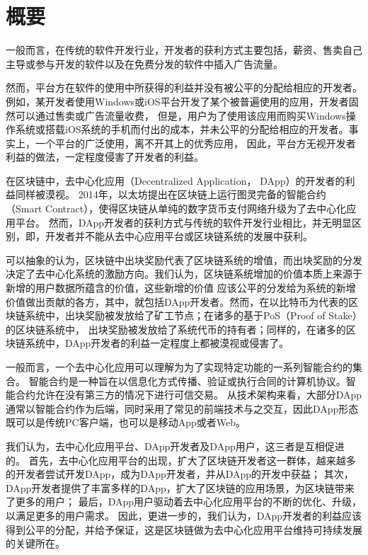 \section{概要}


一般而言，在传统的软件开发行业，开发者的获利方式主要包括，薪资、售卖自己主导或参与开发的软件以及在免费分发的软件中插入广告流量。

然而，平台方在软件的使用中所获得的利益并没有被公平的分配给相应的开发者。例如，某开发者使用Windows或iOS平台开发了某个被普遍使用的应用，开发者固然可以通过售卖或广告流量收费，
但是，用户为了使用该应用而购买Windows操作系统或搭载iOS系统的手机而付出的成本，并未公平的分配给相应的开发者。事实上，一个平台的广泛使用，离不开其上的优秀应用，
因此，平台方无视开发者利益的做法，一定程度侵害了开发者的利益。

在区块链中，去中心化应用（Decentralized Application， DApp）的开发者的利益同样被漠视。
2014年，以太坊提出在区块链上运行图灵完备的智能合约（Smart Contract），使得区块链从单纯的数字货币支付网络升级为了去中心化应用平台。
然而，DApp开发者的获利方式与传统的软件开发行业相比，并无明显区别，即，开发者并不能从去中心应用平台或区块链系统的发展中获利。

可以抽象的认为，区块链中出块奖励代表了区块链系统的增值，而出块奖励的分发决定了去中心化系统的激励方向。我们认为，区块链系统增加的价值本质上来源于新增的用户数据所蕴含的价值，这些新增的价值
应该公平的分发给为系统的新增价值做出贡献的各方，其中，就包括DApp开发者。然而，在以比特币为代表的区块链系统中，出块奖励被发放给了矿工节点；在诸多的基于PoS（Proof of Stake）的区块链系统中，
出块奖励被发放给了系统代币的持有者；同样的，在诸多的区块链系统中，DApp开发者的利益一定程度上都被漠视或侵害了。

一般而言，一个去中心化应用可以理解为为了实现特定功能的一系列智能合约的集合。
智能合约是一种旨在以信息化方式传播、验证或执行合同的计算机协议。智能合约允许在没有第三方的情况下进行可信交易。
从技术架构来看，大部分DApp通常以智能合约作为后端，同时采用了常见的前端技术与之交互，因此DApp形态既可以是传统PC客户端，也可以是移动App或者Web。

我们认为，去中心化应用平台、DApp开发者及DApp用户，这三者是互相促进的。
首先，去中心化应用平台的出现，扩大了区块链开发者这一群体，越来越多的开发者尝试开发DApp，成为DApp开发者，并从DApp的开发中获益；
其次，DApp开发者提供了丰富多样的DApp，扩大了区块链的应用场景，为区块链带来了更多的用户；
最后，DApp用户驱动着去中心化应用平台的不断的优化、升级，以满足更多的用户需求。
因此，更进一步的，我们认为，DApp开发者的利益应该得到公平的分配，并给予保证，这是区块链做为去中心化应用平台维持可持续发展的关键所在。

